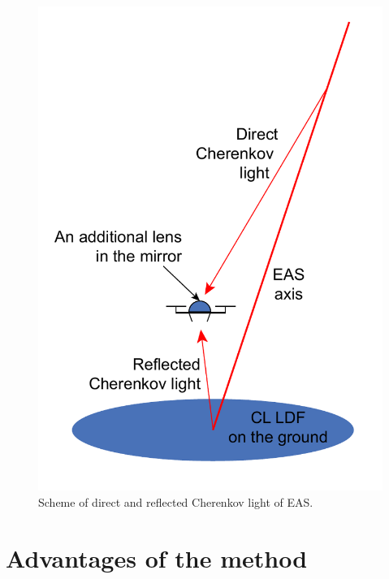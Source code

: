 \documentclass[a4paper]{jpconf}
\begin{document}
\begin{figure}[t]
\centering %
\includegraphics[height=.35\textheight]{DirectCL.pdf}
\caption{Scheme of direct and reflected Cherenkov light of EAS.}
\label{fig:DirectCL}
\end{figure}



\section{Advantages of the method}
\end{document}

